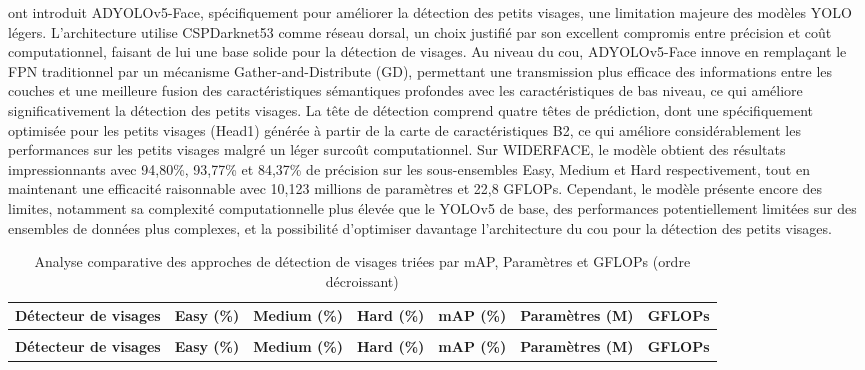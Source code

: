 \begin{onehalfspace}
\hspace{0.65cm} \cite{electronics13214184} ont introduit ADYOLOv5-Face, spécifiquement pour améliorer la détection des petits visages, une limitation majeure des modèles YOLO légers. L'architecture utilise CSPDarknet53 comme réseau dorsal, un choix justifié par son excellent compromis entre précision et coût computationnel, faisant de lui une base solide pour la détection de visages. Au niveau du cou, ADYOLOv5-Face innove en remplaçant le FPN traditionnel par un mécanisme Gather-and-Distribute (GD), permettant une transmission plus efficace des informations entre les couches et une meilleure fusion des caractéristiques sémantiques profondes avec les caractéristiques de bas niveau, ce qui améliore significativement la détection des petits visages. La tête de détection comprend quatre têtes de prédiction, dont une spécifiquement optimisée pour les petits visages (Head1) générée à partir de la carte de caractéristiques B2, ce qui améliore considérablement les performances sur les petits visages malgré un léger surcoût computationnel. Sur WIDERFACE, le modèle obtient des résultats impressionnants avec 94,80\%, 93,77\% et 84,37\% de précision sur les sous-ensembles Easy, Medium et Hard respectivement, tout en maintenant une efficacité raisonnable avec 10,123 millions de paramètres et 22,8 GFLOPs. Cependant, le modèle présente encore des limites, notamment sa complexité computationnelle plus élevée que le YOLOv5 de base, des performances potentiellement limitées sur des ensembles de données plus complexes, et la possibilité d'optimiser davantage l'architecture du cou pour la détection des petits visages.

\begin{xltabular}{\textwidth}{>{\RaggedRight\arraybackslash}p{3cm} >{\centering\arraybackslash}p{2cm} >{\centering\arraybackslash}p{2cm} >{\centering\arraybackslash}p{2cm} >{\centering\arraybackslash}p{2cm} >{\centering\arraybackslash}p{2cm} >{\centering\arraybackslash}p{2cm}}
\caption{Analyse comparative des approches de détection de visages triées par mAP, Paramètres et GFLOPs (ordre décroissant)}
\label{tab:comparative-face-detection-sorted-multiple} \\

\toprule
\textbf{Détecteur de visages} & \textbf{Easy (\%)} & \textbf{Medium (\%)} & \textbf{Hard (\%)} & \textbf{mAP (\%)} & \textbf{Paramètres (M)} & \textbf{GFLOPs} \\
\midrule
\endfirsthead

 \\
\toprule
\textbf{Détecteur de visages} & \textbf{Easy (\%)} & \textbf{Medium (\%)} & \textbf{Hard (\%)} & \textbf{mAP (\%)} & \textbf{Paramètres (M)} & \textbf{GFLOPs} \\
\midrule
\endhead


\end{xltabular}
\end{onehalfspace}
